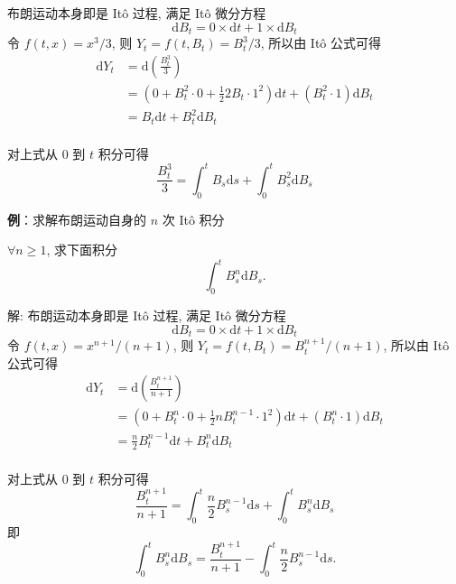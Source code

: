 \documentclass[openany]{ctexbook}
\theoremstyle{kaiti}
\theoremstyle{normal}
\begin{document}
布朗运动本身即是 It\^o 过程, 满足 It\^o 微分方程 
\begin{equation}
  \mathrm{d}B_t=0\times\mathrm{d}t+1\times\mathrm{d}B_t
\end{equation} 
令 $f(t,x)=x^3/3$, 则 $Y_t=f(t,B_t)=B_t^3/3$, 所以由 It\^o 公式可得
\begin{equation}
  \begin{aligned}
  \mathrm{d}Y_t&=\mathrm{d}\left(\frac{B_t^3}{3}\right)\\
  &=\left(0+B_t^2\cdot0+\frac{1}{2}2B_t\cdot1^2\right)\mathrm{d}t+(B_t^2\cdot1)\mathrm{d}B_t\\
  &=B_t\mathrm{d}t+B_t^2\mathrm{d}B_t\\
  \end{aligned}
\end{equation}

对上式从 $0$ 到 $t$ 积分可得
\begin{equation}
  \frac{B_t^3}{3}=\int_0^tB_s\mathrm{d}s+\int_0^tB_s^2\mathrm{d}B_s
\end{equation}

\textbf{例}：求解布朗运动自身的 $n$ 次 It\^o 积分

$\forall n\geqslant1$, 求下面积分
\begin{equation}
  \int_0^tB_s^n\mathrm{d}B_s.
\end{equation}

解: 布朗运动本身即是 It\^o 过程, 满足 It\^o 微分方程 
\begin{equation}
  \mathrm{d}B_t=0\times\mathrm{d}t+1\times\mathrm{d}B_t
\end{equation} 
令 $f(t,x)=x^{n+1}/(n+1)$, 则 $Y_t=f(t,B_t)=B_t^{n+1}/(n+1)$, 所以由 It\^o 公式可得 
\begin{equation}
  \begin{aligned}
  \mathrm{d}Y_t&=\mathrm{d}\left(\frac{B_t^{n+1}}{n+1}\right)\\
  &=\left(0+B_t^n\cdot0+\frac{1}{2}nB_t^{n-1}\cdot1^2\right)\mathrm{d}t+(B_t^n\cdot1)\mathrm{d}B_t\\
  &=\frac{n}{2}B_t^{n-1}\mathrm{d}t+B_t^n\mathrm{d}B_t\\
  \end{aligned}
\end{equation}

对上式从 $0$ 到 $t$ 积分可得
\begin{equation}
  \frac{B_t^{n+1}}{n+1}=\int_0^t\frac{n}{2}B_s^{n-1}\mathrm{d}s+\int_0^tB_s^n\mathrm{d}B_s
\end{equation}
即
\begin{equation}
  \int_0^tB_s^n\mathrm{d}B_s=\frac{B_t^{n+1}}{n+1}-\int_0^t\frac{n}{2}B_s^{n-1}\mathrm{d}s.
\end{equation}
\end{document}

